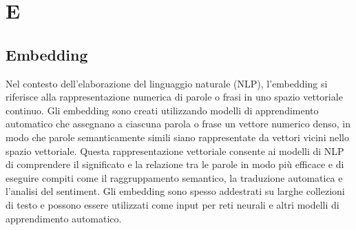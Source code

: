 \section{E}

\vspace{2em}
\subsection*{Embedding}
Nel contesto dell'elaborazione del linguaggio naturale (NLP), l'embedding si riferisce alla rappresentazione numerica di parole o frasi in uno spazio vettoriale continuo. Gli embedding sono creati utilizzando modelli di apprendimento automatico che assegnano a ciascuna parola o frase un vettore numerico denso, in modo che parole semanticamente simili siano rappresentate da vettori vicini nello spazio vettoriale. Questa rappresentazione vettoriale consente ai modelli di NLP di comprendere il significato e la relazione tra le parole in modo più efficace e di eseguire compiti come il raggruppamento semantico, la traduzione automatica e l'analisi del sentiment. Gli embedding sono spesso addestrati su larghe collezioni di testo e possono essere utilizzati come input per reti neurali e altri modelli di apprendimento automatico.
